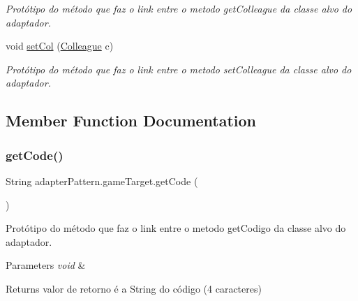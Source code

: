 \begin{DoxyCompactItemize}
\begin{DoxyCompactList}\small\item\em Protótipo do método que faz o link entre o metodo get\+Colleague da classe alvo do adaptador. \end{DoxyCompactList}\item 
void \mbox{\hyperlink{interfaceadapter_pattern_1_1game_target_ae4493af8f85c0459e4e628ffff3fe3b9}{set\+Col}} (\mbox{\hyperlink{classmediator_pattern_1_1_colleague}{Colleague}} c)
\begin{DoxyCompactList}\small\item\em Protótipo do método que faz o link entre o metodo set\+Colleague da classe alvo do adaptador. \end{DoxyCompactList}\end{DoxyCompactItemize}


\subsection{Member Function Documentation}
\mbox{\label{interfaceadapter_pattern_1_1game_target_a32fce3f3dd420116a031b051f2464304}} 
\subsubsection{\texorpdfstring{getCode()}{getCode()}}
{\footnotesize\ttfamily String adapter\+Pattern.\+game\+Target.\+get\+Code (\begin{DoxyParamCaption}{ }\end{DoxyParamCaption})}



Protótipo do método que faz o link entre o metodo get\+Codigo da classe alvo do adaptador. 


\begin{DoxyParams}{Parameters}
{\em void} & \\
\hline
\end{DoxyParams}
\begin{DoxyReturn}{Returns}
valor de retorno é a String do código (4 caracteres) 
\end{DoxyReturn}


